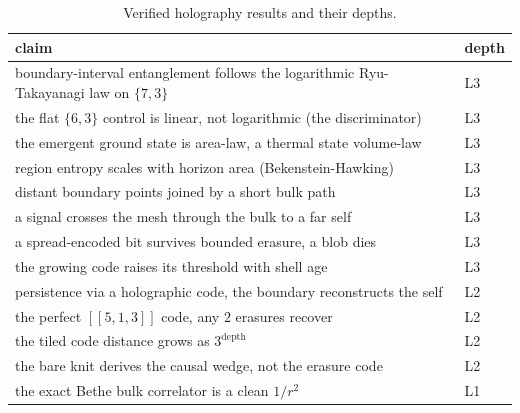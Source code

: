 \begin{table}[ht]
\centering
\begin{tabular}{@{}ll@{}}
\toprule
claim & depth \\
\midrule
boundary-interval entanglement follows the logarithmic Ryu-Takayanagi law on $\{7,3\}$ & L3 \\
the flat $\{6,3\}$ control is linear, not logarithmic (the discriminator) & L3 \\
the emergent ground state is area-law, a thermal state volume-law & L3 \\
region entropy scales with horizon area (Bekenstein-Hawking) & L3 \\
distant boundary points joined by a short bulk path & L3 \\
a signal crosses the mesh through the bulk to a far self & L3 \\
a spread-encoded bit survives bounded erasure, a blob dies & L3 \\
the growing code raises its threshold with shell age & L3 \\
persistence via a holographic code, the boundary reconstructs the self & L2 \\
the perfect $[[5,1,3]]$ code, any $2$ erasures recover & L2 \\
the tiled code distance grows as $3^{\text{depth}}$ & L2 \\
the bare knit derives the causal wedge, not the erasure code & L2 \\
the exact Bethe bulk correlator is a clean $1/r^2$ & L1 \\
\bottomrule
\end{tabular}
\caption{Verified holography results and their depths.}
\label{tab:hol-index}
\end{table}
